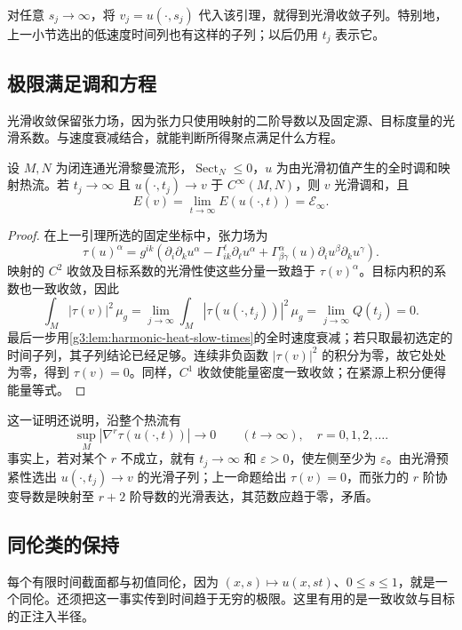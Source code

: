 对任意 \(s_j\to\infty\)，将 \(v_j=u(\cdot,s_j)\) 代入该引理，就得到光滑收敛子列。特别地，上一小节选出的低速度时间列也有这样的子列；以后仍用 \(t_j\) 表示它。

\subsection{极限满足调和方程}
\label{g3:subsec:2605:03}
光滑收敛保留张力场，因为张力只使用映射的二阶导数以及固定源、目标度量的光滑系数。与速度衰减结合，就能判断所得聚点满足什么方程。

\begin{proposition}\label{g3:prop:harmonic-heat-limit-harmonic}
	设 \(M,N\) 为闭连通光滑黎曼流形，\(\operatorname{Sect}_N\le0\)，\(u\) 为由光滑初值产生的全时调和映射热流。若 \(t_j\to\infty\) 且 \(u(\cdot,t_j)\to v\) 于 \(C^\infty(M,N)\)，则 \(v\) 光滑调和，且
	\[
		E(v)=\lim_{t\to\infty}E(u(\cdot,t))=\mathcal E_\infty.
	\]
\end{proposition}
\begin{proof}
	在上一引理所选的固定坐标中，张力场为
	\[
		\tau(u)^\alpha
		=g^{ik}\left(\partial_i\partial_ku^\alpha
		-\Gamma^\ell_{ik}\partial_\ell u^\alpha
		+\Gamma^\alpha_{\beta\gamma}(u)
		\partial_i u^\beta\partial_k u^\gamma\right).
	\]
	映射的 \(C^2\) 收敛及目标系数的光滑性使这些分量一致趋于 \(\tau(v)^\alpha\)。目标内积的系数也一致收敛，因此
	\[
		\int_M|\tau(v)|^2\,\mu_g
		=\lim_{j\to\infty}\int_M|\tau(u(\cdot,t_j))|^2\,\mu_g
		=\lim_{j\to\infty}Q(t_j)=0.
	\]
	最后一步用\cref{g3:lem:harmonic-heat-slow-times}的全时速度衰减；若只取最初选定的时间子列，其子列结论已经足够。连续非负函数 \(|\tau(v)|^2\) 的积分为零，故它处处为零，得到 \(\tau(v)=0\)。同样，\(C^1\) 收敛使能量密度一致收敛；在紧源上积分便得能量等式。
\end{proof}

这一证明还说明，沿整个热流有
\begin{equation}\label{g3:eq:harmonic-heat-tension-decay}
	\sup_M|\nabla^r\tau(u(\cdot,t))|\longrightarrow0
	\qquad(t\to\infty),\quad r=0,1,2,\ldots.
\end{equation}
事实上，若对某个 \(r\) 不成立，就有 \(t_j\to\infty\) 和 \(\varepsilon>0\)，使左侧至少为 \(\varepsilon\)。由光滑预紧性选出 \(u(\cdot,t_j)\to v\) 的光滑子列；上一命题给出 \(\tau(v)=0\)，而张力的 \(r\) 阶协变导数是映射至 \(r+2\) 阶导数的光滑表达，其范数应趋于零，矛盾。

\subsection{同伦类的保持}
\label{g3:subsec:2605:04}
每个有限时间截面都与初值同伦，因为 \((x,s)\mapsto u(x,st)\)、\(0\le s\le1\)，就是一个同伦。还须把这一事实传到时间趋于无穷的极限。这里有用的是一致收敛与目标的正注入半径。

